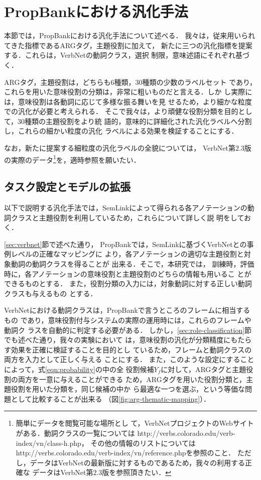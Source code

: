 \documentclass[japanese]{jnlp_1.4}
\begin{document}
\section{PropBankにおける汎化手法}
\label{sec:generalization-criteria-propbank}

本節では，PropBankにおける汎化手法について述べる．
我々は，従来用いられてきた指標であるARGタグ，主題役割に加えて，
新たに三つの汎化指標を提案する．これらは，VerbNetの動詞クラス，選択
制限，意味述語にそれぞれ基づく．

ARGタグ，主題役割は，どちらも$6$種類，$30$種類の少数のラベルセット
であり，これらを用いた意味役割の分類は，非常に粗いものだと言える．しか
し実際には，意味役割は各動詞に応じて多様な振る舞いを見
せるため，より細かな粒度での汎化が必要と考えられる．
そこで我々は，より頑健な役割分類を目的として，$30$種類の主題役割をより統
語的，意味的に詳細化された汎化ラベルへ分割し，これらの細かい粒度の汎化
ラベルによる効果を検証することにする．

なお，新たに提案する細粒度の汎化ラベルの全貌については，
VerbNet第$2.3$版の実際のデータ\footnote{簡単にデータを閲覧可能な場所とし
て，VerbNetプロジェクトのWebサイトがある．動詞クラスの一覧については
http://verbs.colorado.edu/verb-index/vn/class-h.php，
その他の情報のリストについては
http://verbs.colorado.edu/verb-index/vn/reference.phpを参照のこと． ただ
し，データはVerbNetの最新版に対するものであるため，我々の利用する正確な
データはVerbNet第$2.3$版を参照頂きたい．}を，適時参照を願いたい．


\subsection{タスク設定とモデルの拡張}

以下で説明する汎化手法では，SemLinkによって得られる各アノテーションの動
詞クラスと主題役割を利用しているため，これらについて詳しく説
明をしておく．

\ref{sec:verbnet}節で述べた通り，
PropBankでは，SemLinkに基づくVerbNetとの事例レベルの正確なマッピングに
より，各アノテーションの適切な主題役割と対象動詞の動詞クラスを得ることが
出来る．そこで，本研究では，
訓練時，評価時に，各アノテーションの意味役割と主題役割のどちらの情報も用いるこ
とができるものとする．
また，役割分類の入力には，対象動詞に対する正しい動詞クラスも与えるもの
とする．


VerbNetにおける動詞クラスは，PropBankで言うところのフレームに相当するもの
であり，意味役割付与システムの実際の運用時には，これらのフレームや動詞ク
ラスを自動的に判定する必要がある．
しかし，\ref{sec:role-classification}節でも述べた通り，我々の実験において
は，意味役割の汎化が分類精度にもたらす効果を正確に検証することを目的とし
ているため，フレームと動詞クラスの両方を入力として正しく与える
ことにする．
また，このような設定にすることによって，式\ref{eqn:probability}の中の全
役割候補$Y_f$に対して，ARGタグと主題役割の両方を一意に与えることができる
ため，ARGタグを用いた役割分類と，主題役割を用いた分類を，同じ候補の中か
ら最適な一つを選ぶ，という等価な問題として比較することが出来る
（図\ref{fig:arg-thematic-mapping}）．
\end{document}
